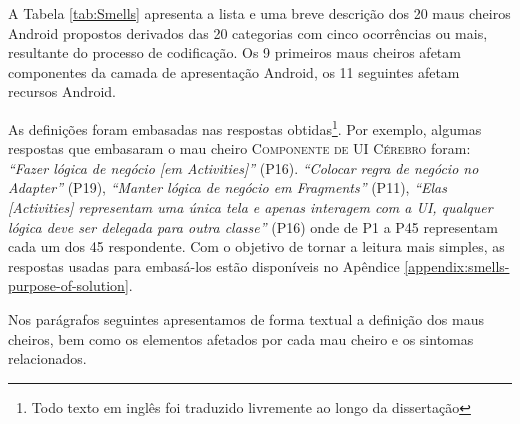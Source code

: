 A Tabela \ref{tab:Smells} apresenta a lista e uma breve descrição dos 20 maus cheiros Android propostos derivados das 20 categorias com cinco ocorrências ou mais, resultante do processo de codificação. Os 9 primeiros maus cheiros afetam componentes da camada de apresentação Android, os 11 seguintes afetam recursos Android. 

As definições foram embasadas nas respostas obtidas\footnote{Todo texto em inglês foi traduzido livremente ao longo da dissertação}. Por exemplo, algumas respostas que embasaram o mau cheiro \textsc{\small Componente de UI Cérebro} foram: \textit{``Fazer lógica de negócio [em Activities]''} (P16). \textit{``Colocar regra de negócio no Adapter''} (P19), \textit{``Manter lógica de negócio em Fragments''} (P11), \textit{``Elas [Activities] representam uma única tela e apenas interagem com a UI, qualquer lógica deve ser delegada para outra classe''} (P16) onde de P1 a P45 representam cada um dos 45 respondente. Com o objetivo de tornar a leitura mais simples, as respostas usadas para embasá-los estão disponíveis no Apêndice \ref{appendix:smells-purpose-of-solution}.


Nos parágrafos seguintes apresentamos de forma textual a definição dos maus cheiros, bem como os elementos afetados por cada mau cheiro e os sintomas relacionados.

